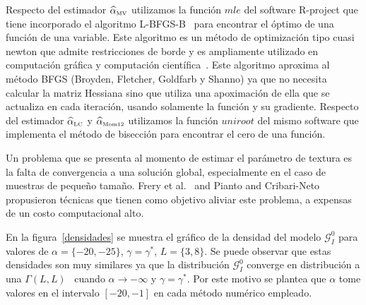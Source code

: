 Respecto del estimador $\widehat{\alpha}_{{\text{\tiny{MV}}}}$ utilizamos la función $mle$ del software R-project que tiene incorporado el algoritmo L-BFGS-B~\cite{Byrd1995} para encontrar el óptimo de una función de una variable. Este algoritmo es un método de optimización tipo cuasi newton que admite restricciones de borde y es ampliamente utilizado en computación gráfica y computación científica~\cite{Fei2014}. Este algoritmo aproxima al método BFGS (Broyden, Fletcher, Goldfarb y Shanno) ya que no necesita calcular la matriz Hessiana sino que utiliza una apoximación de ella que se actualiza en cada iteración, usando solamente la función y su gradiente. 
Respecto del estimador $\widehat{\alpha}_{{\text{\tiny{LC}}}}$ y $\widehat{\alpha}_{{\text{\tiny{Mom12}}}}$ utilizamos la función $uniroot$ del mismo software que implementa el método de bisección para encontrar el cero de una función.

Un problema que se presenta al momento de estimar el parámetro de textura es la falta de convergencia a una solución global, especialmente en el caso de muestras de pequeño tamaño. Frery et al.~\cite{FreryCribariSouza:JASP:04} and Pianto and Cribari-Neto~\cite{DealingMonotoneLikelihood} propusieron técnicas que tienen como objetivo aliviar este problema, a expensas de un costo computacional alto.



En la figura~\ref{densidades} se muestra el gráfico de la densidad del modelo $\mathcal{G}_I^0$ para valores de $\alpha=\{-20,-25\}$, $\gamma=\gamma^*$, $L=\{3,8\}$. Se puede observar que estas densidades son muy similares ya que la distribución $\mathcal{G}_I^0$ converge en distribución a una $\Gamma(L,L)$~\cite{Frery99} cuando $\alpha \longrightarrow -\infty$ y $\gamma=\gamma^*$. Por este motivo se plantea que $\alpha$ tome valores en el intervalo $[-20,-1]$ en cada método numérico empleado. 

